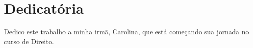 \chapter*{Dedicatória}
Dedico este trabalho a minha irmã, Carolina, que est\'a começando sua jornada no curso de Direito.